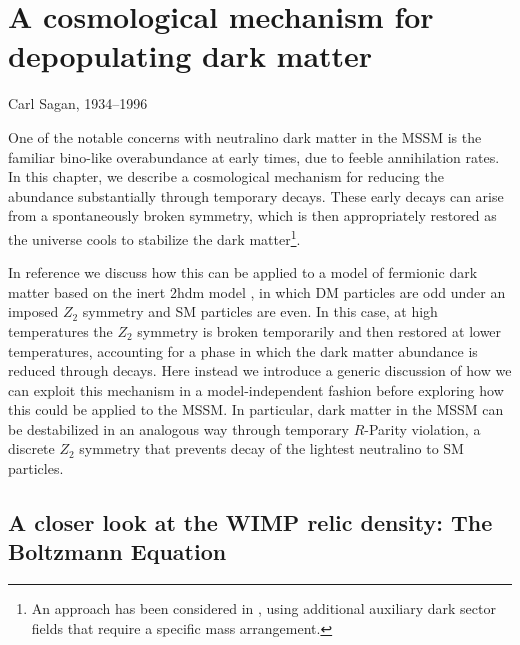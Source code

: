 \chapter{A cosmological mechanism for depopulating dark matter}
\label{chap:wimpdecay}

%
{Carl Sagan, 1934--1996}

One of the notable concerns with neutralino dark matter in the MSSM is the familiar bino-like overabundance at early times, due to feeble annihilation rates. In this chapter, we describe a cosmological mechanism for reducing the abundance substantially through temporary decays. These early decays can arise from a spontaneously broken symmetry, which is then appropriately restored as the universe cools to stabilize the dark matter\footnote{An approach has been considered in \cite{RN739}, using additional auxiliary dark sector fields that require a specific mass arrangement.}.

In reference \cite{RN802} we discuss how this can be applied to a model of fermionic dark matter based on the inert \acrshort{2hdm} model \cite{RN602}, in which DM particles are odd under an imposed $Z_2$ symmetry and SM particles are even. In this case, at high temperatures the $Z_2$ symmetry is broken temporarily and then restored at lower temperatures, accounting for a phase in which the dark matter abundance is reduced through decays. Here instead we introduce a generic discussion of how we can exploit this mechanism in a model-independent fashion before exploring how this could be applied to the MSSM. In particular, dark matter in the MSSM can be destabilized in an analogous way through temporary $R$-Parity violation, a discrete $Z_2$ symmetry that prevents decay of the lightest neutralino to SM particles.

\section{A closer look at the WIMP relic density: The Boltzmann Equation}
\label{sec:boltzmann}

